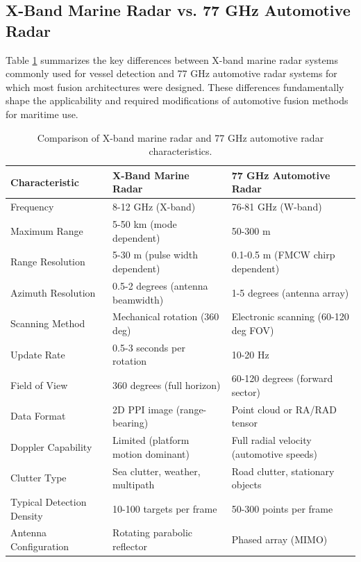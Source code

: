 \subsection{X-Band Marine Radar vs. 77 GHz Automotive Radar}

Table \ref{tab:radar_comparison} summarizes the key differences between X-band marine radar systems commonly used for vessel detection and 77 GHz automotive radar systems for which most fusion architectures were designed. These differences fundamentally shape the applicability and required modifications of automotive fusion methods for maritime use.

\begin{table}[htbp]
\centering
\caption{Comparison of X-band marine radar and 77 GHz automotive radar characteristics.}
\label{tab:radar_comparison}
\begin{tabular}{@{}lll@{}}
\toprule
\textbf{Characteristic} & \textbf{X-Band Marine Radar} & \textbf{77 GHz Automotive Radar} \\
\midrule
Frequency & 8-12 GHz (X-band) & 76-81 GHz (W-band) \\
Maximum Range & 5-50 km (mode dependent) & 50-300 m \\
Range Resolution & 5-30 m (pulse width dependent) & 0.1-0.5 m (FMCW chirp dependent) \\
Azimuth Resolution & 0.5-2 degrees (antenna beamwidth) & 1-5 degrees (antenna array) \\
Scanning Method & Mechanical rotation (360 deg) & Electronic scanning (60-120 deg FOV) \\
Update Rate & 0.5-3 seconds per rotation & 10-20 Hz \\
Field of View & 360 degrees (full horizon) & 60-120 degrees (forward sector) \\
Data Format & 2D PPI image (range-bearing) & Point cloud or RA/RAD tensor \\
Doppler Capability & Limited (platform motion dominant) & Full radial velocity (automotive speeds) \\
Clutter Type & Sea clutter, weather, multipath & Road clutter, stationary objects \\
Typical Detection Density & 10-100 targets per frame & 50-300 points per frame \\
Antenna Configuration & Rotating parabolic reflector & Phased array (MIMO) \\
\bottomrule
\end{tabular}
\end{table}

